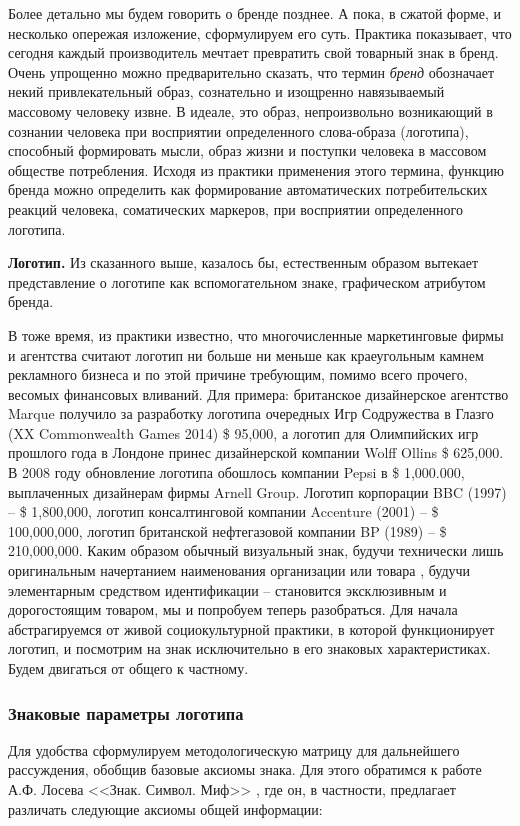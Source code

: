   Более детально мы будем говорить о бренде позднее. А пока, в сжатой форме,
  и несколько опережая изложение, сформулируем его суть. Практика показывает,
  что сегодня каждый производитель мечтает превратить свой товарный знак в бренд.
  Очень упрощенно можно предварительно сказать, что термин \emph{бренд} обозначает
  некий
  привлекательный образ, сознательно и изощренно навязываемый  массовому человеку
  извне. В идеале, это образ, непроизвольно возникающий в сознании человека при
  восприятии определенного слова-образа (логотипа), способный формировать мысли,
  образ жизни и поступки человека в массовом обществе потребления. Исходя из
  практики применения этого термина, функцию бренда можно определить как
  формирование автоматических потребительских реакций человека, соматических
  маркеров, при восприятии определенного логотипа.

\textbf{Логотип.} Из сказанного выше, казалось бы, естественным образом вытекает
  представление о логотипе как вспомогательном знаке, графическом атрибутом бренда.


В тоже время, из практики известно, что многочисленные маркетинговые фирмы и
агентства считают логотип  ни больше ни меньше как краеугольным камнем рекламного
бизнеса и по этой причине требующим, помимо всего прочего, весомых финансовых
вливаний. Для примера: британское дизайнерское агентство Marque получило за
разработку логотипа очередных Игр Содружества в Глазго
(XX Commonwealth Games 2014)  \$ 95,000, а логотип для Олимпийских игр прошлого
года в Лондоне принес дизайнерской компании Wolff Ollins  \$ 625,000.
В 2008 году обновление логотипа обошлось компании Pepsi в \$ 1,000.000,
выплаченных дизайнерам фирмы Arnell Group. Логотип корпорации BBC (1997) --
\$ 1,800,000,  логотип консалтинговой компании Accenture (2001) -- \$ 100,000,000,
логотип британской нефтегазовой компании BP (1989) – \$ 210,000,000\autocite{logotipy}.
Каким образом обычный визуальный знак, будучи технически лишь оригинальным
начертанием наименования организации или товара \autocite[][65]{rogers2001marketing},
будучи элементарным средством идентификации -- становится эксклюзивным и
дорогостоящим товаром, мы и попробуем теперь разобраться. Для начала
абстрагируемся от живой социокультурной практики, в которой функционирует
логотип, и посмотрим на знак исключительно в его знаковых характеристиках.
Будем двигаться от общего к частному.

\subsubsection{Знаковые параметры логотипа}
Для удобства сформулируем методологическую матрицу для дальнейшего
рассуждения, обобщив базовые аксиомы знака. Для этого обратимся к
работе А.Ф. Лосева <<Знак. Символ. Миф>> \autocite[][32-42]{losev1982}, где он, в частности,
предлагает различать следующие аксиомы общей информации:

